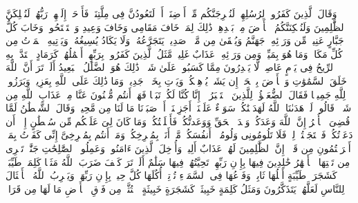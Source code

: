 \stopbuffer
\startbuffer[\q:14:13]
وَقَالَ ٱلَّذِینَ كَفَرُوا۟ لِرُسُلِهِمۡ لَنُخۡرِجَنَّكُم مِّنۡ أَرۡضِنَاۤ أَوۡ لَتَعُودُنَّ فِی مِلَّتِنَاۖ فَأَوۡحَىٰۤ إِلَیۡهِمۡ رَبُّهُمۡ لَنُهۡلِكَنَّ ٱلظَّٰلِمِینَ%
\stopbuffer
\startbuffer[\q:14:14]
وَلَنُسۡكِنَنَّكُمُ ٱلۡأَرۡضَ مِنۢ بَعۡدِهِمۡۚ ذَٰلِكَ لِمَنۡ خَافَ مَقَامِی وَخَافَ وَعِیدِ%
\stopbuffer
\startbuffer[\q:14:15]
وَٱسۡتَفۡتَحُوا۟ وَخَابَ كُلُّ جَبَّارٍ عَنِیدࣲ%
\stopbuffer
\startbuffer[\q:14:16]
مِّن وَرَاۤئِهِۦ جَهَنَّمُ وَیُسۡقَىٰ مِن مَّاۤءࣲ صَدِیدࣲ%
\stopbuffer
\startbuffer[\q:14:17]
یَتَجَرَّعُهُۥ وَلَا یَكَادُ یُسِیغُهُۥ وَیَأۡتِیهِ ٱلۡمَوۡتُ مِن كُلِّ مَكَانࣲ وَمَا هُوَ بِمَیِّتࣲۖ وَمِن وَرَاۤئِهِۦ عَذَابٌ غَلِیظࣱ%
\stopbuffer
\startbuffer[\q:14:18]
مَّثَلُ ٱلَّذِینَ كَفَرُوا۟ بِرَبِّهِمۡۖ أَعۡمَٰلُهُمۡ كَرَمَادٍ ٱشۡتَدَّتۡ بِهِ ٱلرِّیحُ فِی یَوۡمٍ عَاصِفࣲۖ لَّا یَقۡدِرُونَ مِمَّا كَسَبُوا۟ عَلَىٰ شَیۡءࣲۚ ذَٰلِكَ هُوَ ٱلضَّلَٰلُ ٱلۡبَعِیدُ%
\stopbuffer
\startbuffer[\q:14:19]
أَلَمۡ تَرَ أَنَّ ٱللَّهَ خَلَقَ ٱلسَّمَٰوَٰتِ وَٱلۡأَرۡضَ بِٱلۡحَقِّۚ إِن یَشَأۡ یُذۡهِبۡكُمۡ وَیَأۡتِ بِخَلۡقࣲ جَدِیدࣲ%
\stopbuffer
\startbuffer[\q:14:20]
وَمَا ذَٰلِكَ عَلَى ٱللَّهِ بِعَزِیزࣲ%
\stopbuffer
\startbuffer[\q:14:21]
وَبَرَزُوا۟ لِلَّهِ جَمِیعࣰا فَقَالَ ٱلضُّعَفَٰۤؤُا۟ لِلَّذِینَ ٱسۡتَكۡبَرُوۤا۟ إِنَّا كُنَّا لَكُمۡ تَبَعࣰا فَهَلۡ أَنتُم مُّغۡنُونَ عَنَّا مِنۡ عَذَابِ ٱللَّهِ مِن شَیۡءࣲۚ قَالُوا۟ لَوۡ هَدَىٰنَا ٱللَّهُ لَهَدَیۡنَٰكُمۡۖ سَوَاۤءٌ عَلَیۡنَاۤ أَجَزِعۡنَاۤ أَمۡ صَبَرۡنَا مَا لَنَا مِن مَّحِیصࣲ%
\stopbuffer
\startbuffer[\q:14:22]
وَقَالَ ٱلشَّیۡطَٰنُ لَمَّا قُضِیَ ٱلۡأَمۡرُ إِنَّ ٱللَّهَ وَعَدَكُمۡ وَعۡدَ ٱلۡحَقِّ وَوَعَدتُّكُمۡ فَأَخۡلَفۡتُكُمۡۖ وَمَا كَانَ لِیَ عَلَیۡكُم مِّن سُلۡطَٰنٍ إِلَّاۤ أَن دَعَوۡتُكُمۡ فَٱسۡتَجَبۡتُمۡ لِیۖ فَلَا تَلُومُونِی وَلُومُوۤا۟ أَنفُسَكُمۖ مَّاۤ أَنَا۠ بِمُصۡرِخِكُمۡ وَمَاۤ أَنتُم بِمُصۡرِخِیَّ إِنِّی كَفَرۡتُ بِمَاۤ أَشۡرَكۡتُمُونِ مِن قَبۡلُۗ إِنَّ ٱلظَّٰلِمِینَ لَهُمۡ عَذَابٌ أَلِیمࣱ%
\stopbuffer
\startbuffer[\q:14:23]
وَأُدۡخِلَ ٱلَّذِینَ ءَامَنُوا۟ وَعَمِلُوا۟ ٱلصَّٰلِحَٰتِ جَنَّٰتࣲ تَجۡرِی مِن تَحۡتِهَا ٱلۡأَنۡهَٰرُ خَٰلِدِینَ فِیهَا بِإِذۡنِ رَبِّهِمۡۖ تَحِیَّتُهُمۡ فِیهَا سَلَٰمٌ%
\stopbuffer
\startbuffer[\q:14:24]
أَلَمۡ تَرَ كَیۡفَ ضَرَبَ ٱللَّهُ مَثَلࣰا كَلِمَةࣰ طَیِّبَةࣰ كَشَجَرَةࣲ طَیِّبَةٍ أَصۡلُهَا ثَابِتࣱ وَفَرۡعُهَا فِی ٱلسَّمَاۤءِ%
\stopbuffer
\startbuffer[\q:14:25]
تُؤۡتِیۤ أُكُلَهَا كُلَّ حِینِۭ بِإِذۡنِ رَبِّهَاۗ وَیَضۡرِبُ ٱللَّهُ ٱلۡأَمۡثَالَ لِلنَّاسِ لَعَلَّهُمۡ یَتَذَكَّرُونَ%
\stopbuffer
\startbuffer[\q:14:26]
وَمَثَلُ كَلِمَةٍ خَبِیثَةࣲ كَشَجَرَةٍ خَبِیثَةٍ ٱجۡتُثَّتۡ مِن فَوۡقِ ٱلۡأَرۡضِ مَا لَهَا مِن قَرَارࣲ%
\stopbuffer
\startbuffer[\q:14:27]
